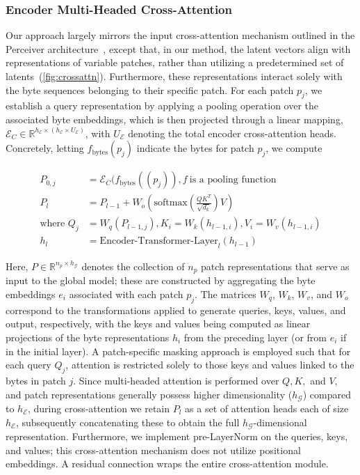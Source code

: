 \subsubsection{Encoder Multi-Headed Cross-Attention}
\label{sec:enc-cross-attn}
Our approach largely mirrors the input cross-attention mechanism outlined in the Perceiver architecture~\citep{jaegle2021perceiver}, except that, in our method, the latent vectors align with representations of variable patches, rather than utilizing a predetermined set of latents~(\autoref{fig:crossattn}). Furthermore, these representations interact solely with the byte sequences belonging to their specific patch. For each patch $p_j$, we establish a query representation by applying a pooling operation over the associated byte embeddings, which is then projected through a linear mapping, $\mathcal{E}_{C} \in \mathbb{R}^{h_{\mathcal{E}} \times (h_{\mathcal{E}} \times U_{\mathcal{E}})}$, with $U_{\mathcal{E}}$ denoting the total encoder cross-attention heads. Concretely, letting $f_{\text{bytes}}(p_j)$ indicate the bytes for patch $p_j$, we compute

\begin{align}
P_{0,j} &= \mathcal{E}_{C}(f_\text{bytes}((p_j)), f~ \text{is a pooling function} \\
P_l &= P_{l-1} + W_o\left(\text{softmax}\left(\frac{QK^T}{\sqrt{d_k}}\right)V\right) \\
\text{where } Q_j &= W_q(P_{l-1,j}), K_i = W_k(h_{l-1,i}), V_i = W_v(h_{l-1,i}) \\
h_l &= \text{Encoder-Transformer-Layer}_l(h_{l-1})
\end{align}

Here, $P \in \mathbb{R}^{n_p \times h_{\mathcal{G}}}$ denotes the collection of $n_p$ patch representations that serve as input to the global model; these are constructed by aggregating the byte embeddings $e_i$ associated with each patch $p_j$. The matrices $W_q$, $W_k$, $W_v$, and $W_o$ correspond to the transformations applied to generate queries, keys, values, and output, respectively, with the keys and values being computed as linear projections of the byte representations $h_i$ from the preceding layer (or from $e_i$ if in the initial layer). A patch-specific masking approach is employed such that for each query $Q_j$, attention is restricted solely to those keys and values linked to the bytes in patch $j$. Since multi-headed attention is performed over $Q, K,$ and $V$, and patch representations generally possess higher dimensionality ($h_{\mathcal{G}}$) compared to $h_{\mathcal{E}}$, during cross-attention we retain $P_l$ as a set of attention heads each of size $h_{\mathcal{E}}$, subsequently concatenating these to obtain the full $h_{\mathcal{G}}$-dimensional representation. Furthermore, we implement pre-LayerNorm on the queries, keys, and values; this cross-attention mechanism does not utilize positional embeddings. A residual connection wraps the entire cross-attention module.

